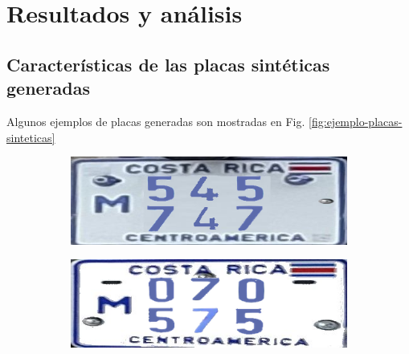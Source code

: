 \chapter{Resultados y análisis}

\section{Características de las placas sintéticas generadas}
Algunos ejemplos de placas generadas son mostradas en Fig. \ref{fig:ejemplo-placas-sinteticas}

\begin{figure}[H]
    \centering
    \begin{subfigure}[t]{0.45\textwidth}
        \centering
        \includegraphics[width=\linewidth]{fig/proy/synthetic_plate_1.png}
    \end{subfigure}
    \hfill
    \begin{subfigure}[t]{0.45\textwidth}
        \centering
        \includegraphics[width=\linewidth]{fig/proy/synthetic_plate_2.png}
    \end{subfigure}
    
	\vspace{1em}
	

\end{figure}
